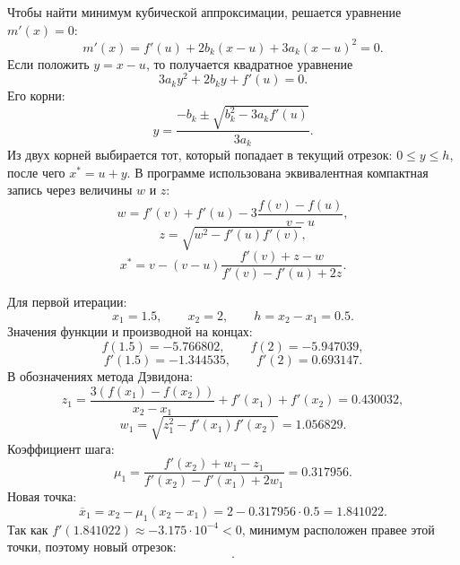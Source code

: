 \documentclass[12pt,a4paper]{article}
\begin{document}
Чтобы найти минимум кубической аппроксимации, решается уравнение $m'(x)=0$:
\begin{equation}
  m'(x)=f'(u)+2b_k(x-u)+3a_k(x-u)^2=0.
\end{equation}
Если положить $y=x-u$, то получается квадратное уравнение
\begin{equation}
  3a_ky^2+2b_ky+f'(u)=0.
\end{equation}
Его корни:
\begin{equation}
  y=\frac{-b_k\pm\sqrt{b_k^2-3a_kf'(u)}}{3a_k}.
\end{equation}
Из двух корней выбирается тот, который попадает в текущий отрезок: $0\le y\le h$, после чего $x^*=u+y$. В программе использована эквивалентная компактная запись через величины $w$ и $z$:
\begin{equation}
  w = f'(v)+f'(u)-3\frac{f(v)-f(u)}{v-u},
\end{equation}
\begin{equation}
  z = \sqrt{w^2-f'(u)f'(v)},
\end{equation}
\begin{equation}
  x^* = v - (v-u)\frac{f'(v)+z-w}{f'(v)-f'(u)+2z}.
\end{equation}

Для первой итерации:
\begin{equation}
  x_1=1.5,\qquad x_2=2,\qquad h=x_2-x_1=0.5.
\end{equation}
Значения функции и производной на концах:
\begin{equation}
  f(1.5)=-5.766802,\qquad f(2)=-5.947039,
\end{equation}
\begin{equation}
  f'(1.5)=-1.344535,\qquad f'(2)=0.693147.
\end{equation}
В обозначениях метода Дэвидона:
\begin{equation}
  z_1=\frac{3(f(x_1)-f(x_2))}{x_2-x_1}+f'(x_1)+f'(x_2)
  =0.430032,
\end{equation}
\begin{equation}
  w_1=\sqrt{z_1^2-f'(x_1)f'(x_2)}
  =1.056829.
\end{equation}
Коэффициент шага:
\begin{equation}
  \mu_1=\frac{f'(x_2)+w_1-z_1}{f'(x_2)-f'(x_1)+2w_1}
  =0.317956.
\end{equation}
Новая точка:
\begin{equation}
  \overline{x}_1=x_2-\mu_1(x_2-x_1)
  =2-0.317956\cdot 0.5=1.841022.
\end{equation}
Так как $f'(1.841022)\approx -3.175\cdot 10^{-4}<0$, минимум расположен правее этой точки, поэтому новый отрезок:
\begin{equation}
  [1.841022,\;2].
\end{equation}
\end{document}

